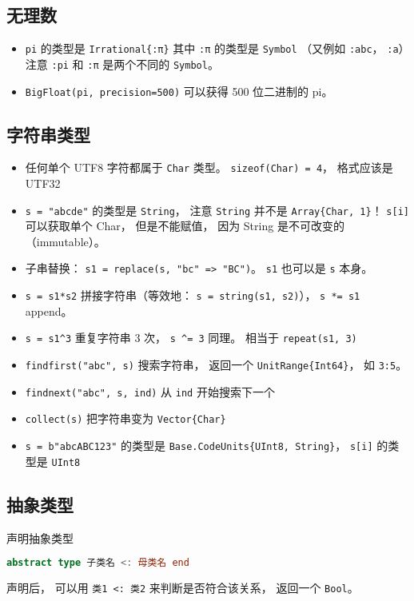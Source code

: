 \subsection{无理数}
\begin{itemize}
\item \verb`pi` 的类型是 \verb`Irrational{:π}` 其中 \verb`:π` 的类型是 \verb`Symbol` （又例如 \verb`:abc`， \verb`:a`）注意 \verb`:pi` 和 \verb`:π` 是两个不同的 \verb`Symbol`。
\item \verb`BigFloat(pi, precision=500)` 可以获得 500 位二进制的 pi。
\end{itemize}


\subsection{字符串类型}
\begin{itemize}
\item 任何单个 UTF8 字符都属于 \verb`Char` 类型。 \verb`sizeof(Char) = 4`， 格式应该是 UTF32
\item \verb`s = "abcde"` 的类型是 \verb`String`， 注意 \verb`String` 并不是 \verb`Array{Char, 1}`！ \verb`s[i]` 可以获取单个 Char， 但是不能赋值， 因为 String 是不可改变的（immutable）。
\item 子串替换： \verb`s1 = replace(s, "bc" => "BC")`。 \verb`s1` 也可以是 \verb`s` 本身。
\item \verb`s = s1*s2` 拼接字符串（等效地： \verb`s = string(s1, s2)`）， \verb`s *= s1` append。
\item \verb`s = s1^3` 重复字符串 3 次， \verb`s ^= 3` 同理。 相当于 \verb`repeat(s1, 3)`
\item \verb`findfirst("abc", s)` 搜索字符串， 返回一个 \verb`UnitRange{Int64}`， 如 \verb`3:5`。
\item \verb`findnext("abc", s, ind)` 从 \verb`ind` 开始搜索下一个
\item \verb`collect(s)` 把字符串变为 \verb`Vector{Char}`
\item \verb`s = b"abcABC123"` 的类型是 \verb`Base.CodeUnits{UInt8, String}`， \verb`s[i]` 的类型是 \verb`UInt8`
\end{itemize}


\subsection{抽象类型}
声明抽象类型
\begin{lstlisting}[language=julia]
abstract type 子类名 <: 母类名 end
\end{lstlisting}
声明后， 可以用 \verb`类1 <: 类2` 来判断是否符合该关系， 返回一个 \verb`Bool`。

